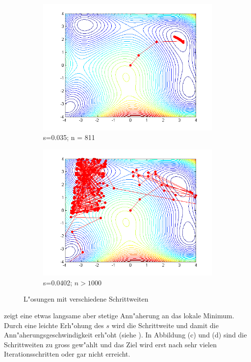 \begin{figure}[h]
\begin{subfigure}[b]{0.49\textwidth}
\centering
\includegraphics[width=\textwidth]{descent/HB_3.png}
\caption{s=0.035; n = 811}
\end{subfigure} \begin{subfigure}[b]{0.49\textwidth}
\centering
\includegraphics[width=\textwidth]{descent/HB_4.png}
\caption{s=0.0402; $n > 1000$}
\end{subfigure}
\caption{L"osungen mit verschiedene Schrittweiten}
\label{schrittweite}
\end{figure}

 zeigt eine etwas langsame aber stetige Ann"aherung
an das lokale Minimum. Durch eine leichte Erh"ohung des $s$ wird die
Schrittweite und damit die Ann"aherungsgeschwindigkeit erh"oht (siehe
 ).
In Abbildung (c) und (d) sind die Schrittweiten zu gross gew"ahlt und das Ziel
wird erst nach sehr vielen Iterationsschritten oder gar nicht erreicht.


